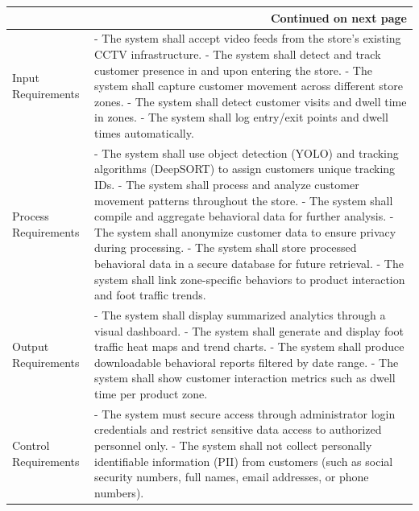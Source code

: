 {{\begin{longtable}{|p{4cm}|p{11cm}|}
		\hline \multicolumn{2}{|r|}{{Continued on next page}} \\ \hline
		\endfoot
		
		\hline
		\endlastfoot
		
		Input Requirements & 
		- The system shall accept video feeds from the store's existing CCTV infrastructure. \newline
		- The system shall detect and track customer presence in and upon entering the store. \newline
		- The system shall capture customer movement across different store zones. \newline
		- The system shall detect customer visits and dwell time in zones. \newline
		- The system shall log entry/exit points and dwell times automatically. \\*
		\hline
		Process Requirements & 
		- The system shall use object detection (YOLO) and tracking algorithms (DeepSORT) to assign customers unique tracking IDs. \newline
		- The system shall process and analyze customer movement patterns throughout the store. \newline
		- The system shall compile and aggregate behavioral data for further analysis. \newline
		- The system shall anonymize customer data to ensure privacy during processing. \newline
		- The system shall store processed behavioral data in a secure database for future retrieval. \newline
		- The system shall link zone-specific behaviors to product interaction and foot traffic trends. \\
		\hline
		
		Output Requirements & 
		- The system shall display summarized analytics through a visual dashboard. \newline
		- The system shall generate and display foot traffic heat maps and trend charts. \newline
		- The system shall produce downloadable behavioral reports filtered by date range. \newline
		- The system shall show customer interaction metrics such as dwell time per product zone. \\
		\hline
		
		Control Requirements & 
		- The system must secure access through administrator login credentials and restrict sensitive data access to authorized personnel only. \newline
		- The system shall not collect personally identifiable information (PII) from customers (such as social security numbers, full names, email addresses, or phone numbers). \\
		\hline
		

\end{longtable}}}
